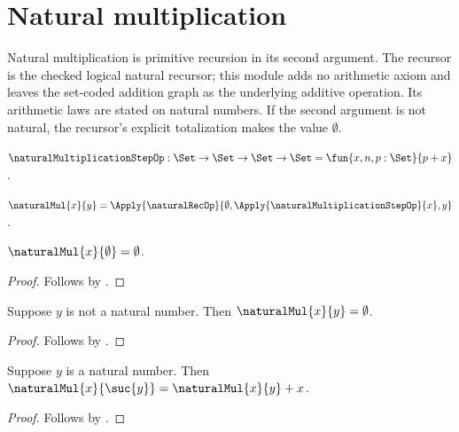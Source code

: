 \section{Natural multiplication}



Natural multiplication is primitive recursion in its second argument.  The
recursor is the checked logical natural recursor; this module adds no arithmetic
axiom and leaves the set-coded addition graph as the underlying additive
operation.  Its arithmetic laws are stated on natural numbers.  If the second
argument is not natural, the recursor's explicit totalization makes the value
$\emptyset$.

\begin{definition}\label{natural_multiplication_step}
    $\naturalMultiplicationStepOp:\Set\to\Set\to\Set\to\Set
        =\fun{x,n,p:\Set}{p+x}$.
\end{definition}

\begin{definition}\label{natural_multiplication}
    $\naturalMul{x}{y}=
        \Apply{\naturalRecOp}{\emptyset,
                    \Apply{\naturalMultiplicationStepOp}{x},y}$.
\end{definition}

\begin{proposition}\label{natural_multiplication_zero_right}
    $\naturalMul{x}{\emptyset}=\emptyset$.
\end{proposition}
\begin{proof}
    Follows by
        .
\end{proof}

\begin{proposition}\label{natural_multiplication_off_domain}
    Suppose $y$ is not a natural number.
    Then $\naturalMul{x}{y}=\emptyset$.
\end{proposition}
\begin{proof}
    Follows by
        .
\end{proof}

\begin{proposition}\label{natural_multiplication_successor_right}
    Suppose $y$ is a natural number.
    Then $\naturalMul{x}{\suc{y}}=\naturalMul{x}{y}+x$.
\end{proposition}
\begin{proof}
    Follows by
        .
\end{proof}

